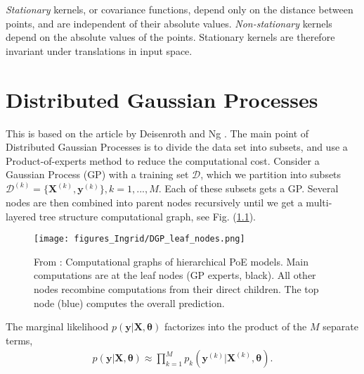 \documentclass[twoside,english]{uiofysmaster}
\begin{document}
\textit{Stationary} kernels, or covariance functions, depend only on the distance between points, and are independent of their absolute values. \textit{Non-stationary } kernels depend on the absolute values of the points. Stationary kernels are therefore invariant under translations in input space. 















\chapter{Distributed Gaussian Processes}

This is based on the article by Deisenroth and Ng \cite{deisenroth2015distributed}. The main point of Distributed Gaussian Processes is to divide the data set into subsets, and use a Product-of-experts method to reduce the computational cost. Consider a Gaussian Process (GP) with a training set $\mathcal{D}$, which we partition into subsets $\mathcal{D}^{(k)} = \{ \textbf{X}^{(k)}, \textbf{y}^{(k)}\}, k=1,...,M$. Each of these subsets gets a GP. Several nodes are then combined into parent nodes recursively until we get a multi-layered tree structure computational graph, see Fig. (\ref{Fig:: DGP leaf nodes}). 

\begin{figure}[H]\label{Fig:: DGP leaf nodes}
\centering
\texttt{[image: figures\_Ingrid/DGP\_leaf\_nodes.png]}
\caption{From \cite{deisenroth2015distributed}: Computational graphs of hierarchical PoE models. Main computations are at the leaf nodes (GP experts, black). All other
nodes recombine computations from their direct children. The top node (blue) computes the overall prediction.}
\end{figure}

The marginal likelihood $p(\textbf{y}|\textbf{X}, \boldsymbol{\theta})$ factorizes into the product of the $M$ separate terms,
\begin{align}\label{Eq:: DGP marginal likelihood}
p(\textbf{y}|\textbf{X}, \boldsymbol{\theta}) \approx \prod_{k=1}^M p_k (\textbf{y}^{(k)}|\textbf{X}^{(k)}, \boldsymbol{\theta}).
\end{align}
\end{document}
